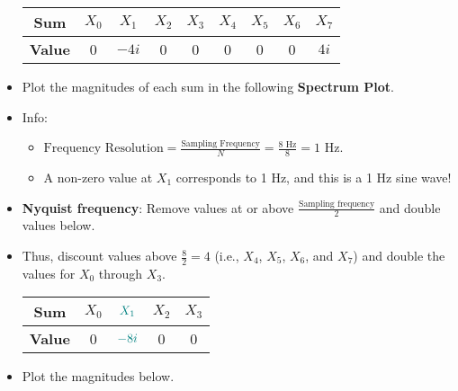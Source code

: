 \documentclass{article}
\begin{document}
\begin{itemize}
\begin{table}[h!]
        \begin{tabular}{c|cccccccc}
            \textbf{Sum} & $X_0$ & $X_1$ & $X_2$ & $X_3$ & $X_4$ & $X_5$ & $X_6$ & $X_7$\\
            \hline
            \textbf{Value} & 0 & $-4i$ & 0 & 0 & 0 & 0 & 0 & $4i$\\
        \end{tabular}
    \end{table}
    \item Plot the magnitudes of each sum in the following \textbf{Spectrum Plot}.
    \begin{center}
    \end{center}
    \item Info:
    \begin{itemize}
        \item $
            \text{Frequency Resolution}
            = \frac{\text{Sampling Frequency}}{N}
            = \frac{8\text{ Hz}}{8}
            = 1\text{ Hz}
        $.
        \item A non-zero value at $X_1$ corresponds to 1 Hz, and this is a 1 Hz sine wave!
    \end{itemize}
    \item \textbf{Nyquist frequency}: Remove values at or above $\frac{\text{Sampling frequency}}{2}$ and double values below.
    \item Thus, discount values above $\frac{8}{2}=4$ (i.e., $X_4$, $X_5$, $X_6$, and $X_7$) and double the values for $X_0$ through $X_3$.
    \begin{table}[h!]
        \centering
        \renewcommand{\arraystretch}{1.4}
        \begin{tabular}{c|cccc}
            \textbf{Sum} & $X_0$ & ${\color{teal}X_1}$ & $X_2$ & $X_3$\\
            \hline
            \textbf{Value} & 0 & ${\color{teal}-8i}$ & 0 & 0\\
        \end{tabular}
    \end{table}
    \item Plot the magnitudes below.
    \begin{center}
\end{center}
\end{itemize}
\end{document}
